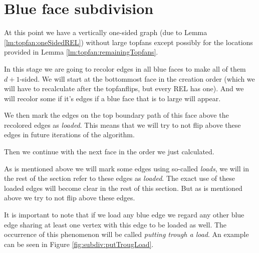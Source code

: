 
\section{Blue face subdivision}
\label{s:subdiv}


At this point we have a vertically one-sided graph (due to Lemma \ref{lm:topfan:oneSidedREL}) without large topfans except possibly for the locations provided in Lemma \ref{lm:topfan:remainingTopfans}.

In this stage we are going to recolor edges in all blue faces to make all of them $d+1$-sided. We will start at the bottommost face in the creation order (which we will have to recalculate after the topfanflips, but every REL has one). And we will recolor some if it's edges if a blue face that is to large will appear. 

We then mark the edges on the top boundary path of this face above the recolored edges as \emph{loaded}. This means that we will try to not flip above these edges in future iterations of the algorithm.

Then we continue with the next face in the order we just calculated.


As is mentioned above we will mark some edges using so-called \emph{loads}, we will in the rest of the section refer to these edges as \emph{loaded}. The exact use of these loaded edges will become clear in the rest of this section. But as is mentioned above we try to not flip above these edges.

It is important to note that if we load any blue edge we regard any other blue edge sharing at least one vertex with this edge to be loaded as well. The occurrence of this phenomenon will be called \emph{putting trough a load}. An example can be seen in Figure \ref{fig:subdiv:putTrougLoad}.

